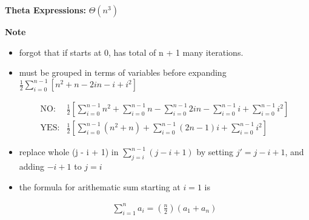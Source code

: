\documentclass[12pt]{article}
\begin{document}
\begin{itemize}
    \textbf{Theta Expressions:} $\Theta (n^3)$

    \bigskip

    \textbf{Note}

    \begin{itemize}
     \item forgot that if starts at 0, has total of n + 1 many iterations.
     \item must be grouped in terms of variables before expanding\\
     $\frac{1}{2} \sum\limits_{i=0}^{n-1} \left[ n^2 + n - 2in -i + i^2 \right]$

        \begin{align}
            \text{NO:}&  \frac{1}{2} \left[ \sum\limits_{i=0}^{n-1} n^2 + \sum\limits_{i=0}^{n-1} n - \sum\limits_{i=0}^{n-1} 2in - \sum\limits_{i=0}^{n-1} i + \sum\limits_{i=0}^{n-1} i^2 \right]\\
            \text{YES:}& \frac{1}{2} \left[ \sum\limits_{i=0}^{n-1} (n^2 + n) + \sum\limits_{i=0}^{n-1} (2n-1)i + \sum\limits_{i=0}^{n-1} i^2 \right]
        \end{align}

     \item replace whole (j - i + 1) in $\sum\limits_{j = i}^{n-1} (j - i + 1)$
     by setting $j' = j - i + 1$, and adding $-i + 1$ to $j = i$
     \item the formula for arithematic sum starting at $i = 1$ is

     \begin{align}
        \sum\limits_{i=1}^n a_i = \left(\frac{n}{2}\right) (a_1 + a_n)
     \end{align}
    \end{itemize}

\end{itemize}
\end{document}
